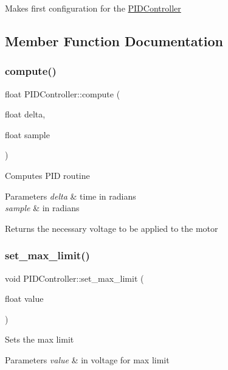 Makes first configuration for the \mbox{\hyperlink{classPIDController}{P\+I\+D\+Controller}} 

\subsection{Member Function Documentation}
\mbox{\label{classPIDController_afd70ecf3f6f5f10181860eb067da1b43}} 
\subsubsection{\texorpdfstring{compute()}{compute()}}
{\footnotesize\ttfamily float P\+I\+D\+Controller\+::compute (\begin{DoxyParamCaption}\item[{float}]{delta,  }\item[{float}]{sample }\end{DoxyParamCaption})}

Computes P\+ID routine 
\begin{DoxyParams}{Parameters}
{\em delta} & time in radians \\
\hline
{\em sample} & in radians \\
\hline
\end{DoxyParams}
\begin{DoxyReturn}{Returns}
the necessary voltage to be applied to the motor 
\end{DoxyReturn}
\mbox{\label{classPIDController_aa6bc9afda2652915eaee75376ac35ec9}} 
\subsubsection{\texorpdfstring{set\+\_\+max\+\_\+limit()}{set\_max\_limit()}}
{\footnotesize\ttfamily void P\+I\+D\+Controller\+::set\+\_\+max\+\_\+limit (\begin{DoxyParamCaption}\item[{float}]{value }\end{DoxyParamCaption})}

Sets the max limit 
\begin{DoxyParams}{Parameters}
{\em value} & in voltage for max limit \\
\hline
\end{DoxyParams}
\mbox{\label{classPIDController_a0e3ca1d0d38d9348cda94e8deb9b6497}} 
